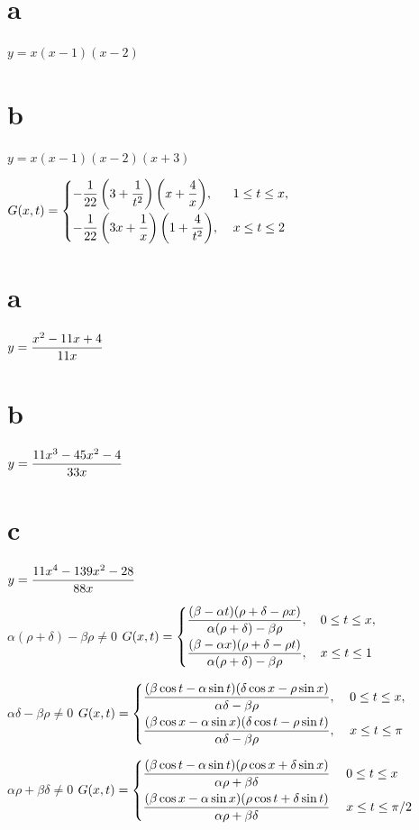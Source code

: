 \smallskip
\quad \quad
\part{a} $y=x(x-1)(x-2)$\;
\part{b} $y=x(x-1)(x-2)(x+3)$

\smallskip
{}
$G(x,t)=
\begin{cases}
-\displaystyle{\frac{1}{22}\left(3+\frac{1}{t^{2}}\right)\left(x+\frac{4}{x}\right)},&\;1\le t\le x,\\[.11in]
-\displaystyle{\frac{1}{22}\left(3x+\frac{1}{x}\right)\left(1+\frac{4}{t^{2}}\right)},&\;x\le t\le2
\end{cases}$

\smallskip

\quad \quad
\part{a}
$y=\displaystyle{\frac{x^{2}-11x+4}{11x}}$\;
\part{b}
$y=\displaystyle{\frac{11x^{3}-45x^{2}-4}{33x}}$\;
\part{c}
$y=\displaystyle{\frac{11x^{4}-139x^{2}-28}{88x}}$

\smallskip
{} $\alpha(\rho+\delta)-\beta\rho\ne0$   \quad
$G(x,t)=
\begin{cases}
\displaystyle{\frac{(\beta-\alpha t)(\rho+\delta-\rho x)}{\alpha(\rho+\delta)-\beta\rho}},\quad0\le t\le x,\\[.11in]
\displaystyle{\frac{(\beta-\alpha x)(\rho+\delta-\rho t)}{\alpha(\rho+\delta)-\beta\rho}},\quad  x\le t\le1
\end{cases}$

\smallskip
{}
$\alpha\delta-\beta\rho\ne0$  \quad
$G(x,t)=
\begin{cases}
\displaystyle{\frac{(\beta\cos t-\alpha\sin t)(\delta\cos x-\rho\sin
x)}{\alpha\delta-\beta\rho}},\;&0\le t\le x,\\[.11in]
\displaystyle{\frac{(\beta\cos x-\alpha\sin x)(\delta\cos t-\rho\sin t)}{\alpha\delta-\beta\rho}},\;&x\le t\le\pi
\end{cases}$

\smallskip
{} $\alpha\rho+\beta\delta\ne0$ \;
$G(x,t)=
\begin{cases}
\displaystyle{\frac{(\beta\cos t-\alpha\sin t)(\rho\cos x+\delta\sin x)}{\alpha\rho+\beta\delta}}\;& 0\le t\le x  \\[.11in]
\displaystyle{\frac{(\beta\cos x-\alpha\sin x)(\rho\cos t+\delta\sin t)}{\alpha\rho+\beta\delta}}\;
&x\le t\le \pi/2
\end{cases}$

